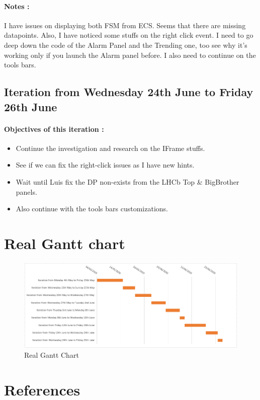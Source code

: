 \documentclass[a4paper, 12pt]{article}
\begin{document}
\begin{appendix}
    \paragraph{Notes :}
    I have issues on displaying both FSM from ECS. Seems that there are missing datapoints. Also, I have noticed some stuffs on the right click event.
    I need to go deep down the code of the Alarm Panel and the Trending one, too see why it's working only if you launch the Alarm panel before.
    I also need to continue on the tools bars.
    \subsection{Iteration from Wednesday 24th June to Friday 26th June}
    \paragraph{Objectives of this iteration :}
    \begin{itemize}
        \item Continue the investigation and research on the IFrame stuffs.
        \item See if we can fix the right-click issues as I have new hints.
        \item Wait until Luis fix the DP non-exists from the LHCb Top \& BigBrother panels.
        \item Also continue with the tools bars customizations.
    \end{itemize}

    \newpage
    \section{Real Gantt chart}
    \begin{figure}[h]
        \centering
        \includegraphics[scale = 0.6]{images/gantt.png}
        \caption{Real Gantt Chart}
    \end{figure}
\end{appendix}

\newpage
\section{References}
\nocite{*}
\printbibliography[heading=subbibintoc,type=article,title={Bibliography}]
\printbibliography[heading=subbibintoc,type=misc,title={Webography}]
\end{document}
